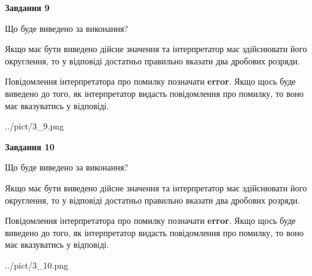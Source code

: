 \documentclass[12pt, ukrainian]{article}
\begin{document}
{\begin {Large}
{\begin {center}\textbf{Завдання 9}\end {center}}\par
Що буде виведено за виконання? \par

Якщо має бути виведено дійсне значення та інтерпретатор має здійснювати його округлення, 
то у відповіді достатньо правильно вказати два дробових розряди.

Повідомлення інтерпретатора про помилку позначати \textbf{error}.
Якщо щось буде виведено до того, як інтерпретатор видасть повідомлення про помилку, 
то воно має вказуватись у відповіді. \par

\begin{center}
	{../pict/3_9.png}
\end{center}
\newpage

{\begin {center}\textbf{Завдання 10}\end {center}}\par
Що буде виведено за виконання? \par

Якщо має бути виведено дійсне значення та інтерпретатор має здійснювати його округлення, 
то у відповіді достатньо правильно вказати два дробових розряди.

Повідомлення інтерпретатора про помилку позначати \textbf{error}.
Якщо щось буде виведено до того, як інтерпретатор видасть повідомлення про помилку, 
то воно має вказуватись у відповіді. \par

\begin{center}
	{../pict/3_10.png}
\end{center}
\newpage

\end {Large}}
\end{document}
